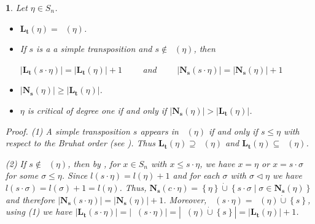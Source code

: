\documentclass[a4 paper,12pt]{article}
\newcommand{\sma}{\triangleleft}
\newcommand{\ma}{\leqslant}
\DeclareMathOperator{\Red}{R_{\textbf{d}}}
\newtheorem{subnum}{}[numeris]
\begin{document}
	
	\begin{subnum} \textit{Let  $\eta\in S_n$. }
	\begin{itemize}
		\item[(1)] \textit{$\textbf{L}_{\textbf{t}}(\eta)  =  \Red(\eta)$.} 
		\item[(2)] \textit{If   $s$ is a  a simple transposition and  $s\not\in \Red(\eta)$, then}	 
		\begin{center}
		\textit{$\left|\textbf{L}_{\textbf{t}}(s\cdot\eta)\right| = \left|\textbf{L}_{\textbf{t}}(\eta)\right| +1$ \  \  \  \  and  \  \  \  \  
						$\left|\textbf{N}_{\textbf{s}}(s\cdot\eta)\right| = \left|\textbf{N}_{\textbf{s}}(\eta)\right| +1$}
\end{center}
		 \item[(3)]  \textit{$\left|\textbf{N}_{\textbf{s}}(\eta)\right| \geq \left|\textbf{L}_{\textbf{t}}(\eta)\right| $.}
	\item[(4)]  \textit{$\eta$ is critical of degree one if and only if  $\left|\textbf{N}_{\textbf{s}}(\eta)\right|  > \left|\textbf{L}_{\textbf{t}}(\eta)\right| $.}

	\end{itemize}
	
	\textit{Proof.} (1) A simple transposition $s$ appears in   $\Red(\eta)$ if and only if $s \ma \eta$ with respect to the Bruhat  order (see \cite[Corollary 2.2.3]{Bjor}). Thus  $\textbf{L}_{\textbf{t}}(\eta)  \supseteq  \Red(\eta)$  and  $\textbf{L}_{\textbf{t}}(\eta) \subseteq  \Red(\eta)$. 
	
	(2)  If   $s\not\in \Red(\eta)$, then  
by \cite[Proposition 2.2.7]{Bjor},  for $x\in S_n$ with $x\ma s\cdot \eta$, we have $x=\eta$ or   $x=s\cdot \sigma$ for some  $\sigma\ma\eta$. 
 Since $l(s\cdot\eta)=l(\eta)+1$ and for each $\sigma$ with $\sigma\sma \eta $ we have $l(s\cdot\sigma)=l(\sigma)+1 = l(\eta)$. Thus, 
$\textbf{N}_{\textbf{s}}(c\cdot  \eta) = \left\{\eta\right\}\dot{\cup} \left\{s\cdot \sigma \mid \sigma \in \textbf{N}_{\textbf{s}}(\eta) \right\} $
  and therefore  $\left|\textbf{N}_{\textbf{s}}(s\cdot  \eta)\right| = \left|\textbf{N}_{\textbf{s}}(\eta)\right| +1$. 
Moreover, 	$ \Red(s\cdot\eta) =  \Red(\eta) \dot{\cup} \left\{s\right\}$, using (1) we have $\left|\textbf{L}_{\textbf{t}}(s\cdot\eta)\right| =\left|\Red(s\cdot\eta)\right| = \left| \Red(\eta) \dot{\cup} \left\{s\right\}\right| = \left|\textbf{L}_{\textbf{t}}(\eta)\right| +1$. 
	



\end{subnum}
\end{document}
